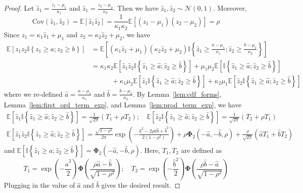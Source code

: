 \documentclass[10pt]{article} %
\theoremstyle{definition}
\theoremstyle{plain}
\newcommand{\paren}[1]{\left(#1\right)}
\newcommand{\indy}[1]{\mathbb{I}\left\{#1\right\}}
\providecommand{\E}{\mathbb{E}}
\begin{document}
\begin{proof}
    Let $\hat{z}_1 = \frac{z_1-\mu_1}{\kappa_1}$ and $\hat{z}_1 = \frac{z_2 - \mu_2}{\kappa_2}$. Then we have $\hat{z}_1,\hat{z}_2\sim\mathcal{N}\paren{0, 1}$. Moreover,
    \[
        \text{Cov}\paren{\hat{z}_1,\hat{z}_2} = \E\left[\hat{z}_1\hat{z}_2\right] = \frac{1}{\kappa_1\kappa_2}\E\left[\paren{z_1-\mu_1}\paren{z_2 - \mu_2}\right] = \rho
    \]
    Since $z_1 = \kappa_1\hat{z}_1 + \mu_1$ and $z_2 = \kappa_2\hat{z}_2 + \mu_2$, we have
    \begin{align*}
        \E\left[z_1z_2\indy{z_1\geq a;z_2\geq b}\right] & = \E\left[\paren{\kappa_1\hat{z}_1 + \mu_1}\paren{\kappa_2\hat{z}_2 + \mu_2}\indy{\hat{z}_1\geq \frac{a-\mu_1}{\kappa_1};\hat{z}_2\geq \frac{b - \mu_2}{\kappa_2}}\right]\\
        & = \kappa_1\kappa_2\E\left[\hat{z}_1\hat{z}_2\indy{\hat{z}_1\geq\hat{a};\hat{z}_2\geq\hat{b}}\right] + \mu_1\mu_2\E\left[\indy{\hat{z}_1\geq\hat{a};\hat{z}_2\geq\hat{b}}\right]\\
        & \quad\quad\quad + \kappa_1\mu_2\E\left[\hat{z}_1\indy{\hat{z}_1\geq\hat{a};\hat{z}_2\geq\hat{b}}\right] +\kappa_2\mu_1\E\left[\hat{z}_2\indy{\hat{z}_1\geq\hat{a};\hat{z}_2\geq\hat{b}}\right]
    \end{align*}
    where we re-defined $\hat{a} = \frac{a- \mu_1}{\kappa_1}$ and $\hat{b} = \frac{b - \mu_2}{\kappa_2}$. By Lemma~\ref{lem:cdf_forms}, Lemma~\ref{lem:first_ord_term_exp}, and Lemma~\ref{lem:prod_term_exp}, we have
    \begin{gather*}
        \E\left[\hat{z}_1\indy{\hat{z}_1\geq \hat{a}; \hat{z}_2\geq \hat{b}}\right] =\frac{1}{\sqrt{2\pi}}\paren{T_1 + \rho T_2};\quad \E\left[\hat{z}_2\indy{\hat{z}_1\geq \hat{a}; \hat{z}_2\geq \hat{b}}\right] = \frac{1}{\sqrt{2\pi}}\paren{T_2 + \rho T_1}\\
        \E\left[\hat{z}_1\hat{z}_2\indy{\hat{z}_1\geq \hat{a};\hat{z}_2\geq \hat{b}}\right] =  \frac{\sqrt{1-\rho^2}}{2\pi}\exp\paren{-\frac{\hat{a}^2 - 2\rho \hat{a}\hat{b} + \hat{b}^2}{2\paren{1-\rho^2}}} + \rho\bm{\Phi}_2\paren{-\hat{a},-\hat{b},\rho} + \frac{\rho}{\sqrt{2\pi}}\paren{\hat{a}T_1 + \hat{b}T_2}
    \end{gather*}
    and $\E\left[\indy{\hat{z}_1\geq\hat{a};\hat{z}_2\geq\hat{b}}\right] = \bm{\Phi}_2\paren{-\hat{a}, -\hat{b}, \rho}$. Here, $T_1, T_2$ are defined as
    \[
        T_1 = \exp\paren{-\frac{\hat{a}^2}{2}}\bm{\Phi}\paren{\frac{\rho\hat{a}-\hat{b}}{\sqrt{1-\rho^2}}};\quad T_2 = \exp\paren{-\frac{\hat{b}^2}{2}}\bm{\Phi}\paren{\frac{\rho\hat{b}-\hat{a}}{\sqrt{1-\rho^2}}}
    \]
    Plugging in the value of $\hat{a}$ and $\hat{b}$ gives the desired result.
\end{proof}
\end{document}

